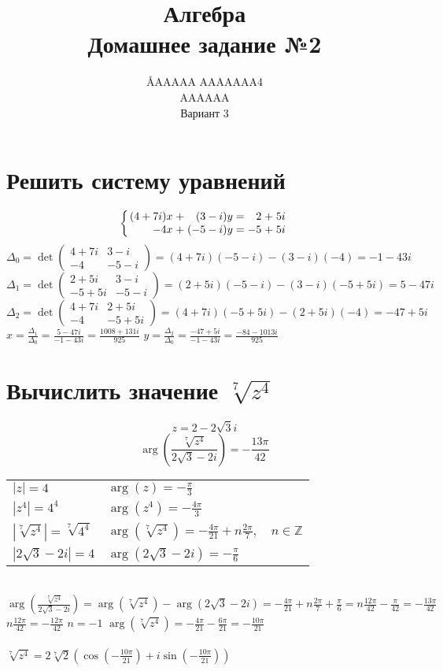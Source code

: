 \documentclass{article}
\title{Алгебра \\ Домашнее задание №2}
\author{\AA{AAAAA AAAAAAA}{4} \\ AAAAAA \\ Вариант 3}
\newcommand{\ds}{\displaystyle}
\newcommand{\abs}[1]{\left|#1\right|}
\newcommand{\Arg}[1]{\arg\left(#1\right)}
\newcommand{\TrigFrom}[1]{
  \left(\cos\left({#1}\right)+i\sin\left({#1}\right)\right)
}
\begin{document}
  \maketitle

  \section{Решить систему уравнений}
  \[
    \left\{
      \arraycolsep=1.4pt
      \begin{array}{rrrrrrr}
        (4+7i)x &+& (3-i)y &=& 2&+&5i \\
        -4x &+& (-5-i)y &=& -5&+&5i
      \end{array}
    \right.
  \]
  $\ds \Delta_0 = \det\begin{pmatrix}
    4+7i & 3-i \\
    -4 & -5-i
  \end{pmatrix} = (4+7i)(-5-i)-(3-i)(-4) = -1-43i$
  \\
  $\ds \Delta_1 = \det\begin{pmatrix}
    2+5i & 3-i \\
    -5+5i & -5-i
  \end{pmatrix} = (2+5i)(-5-i)-(3-i)(-5+5i) = 5-47i$
  \\
  $\ds \Delta_2 = \det\begin{pmatrix}
    4+7i & 2+5i \\
    -4 & -5+5i
  \end{pmatrix} = (4+7i)(-5+5i)-(2+5i)(-4) = -47+5i$
  \\
  $\ds x = \frac{\Delta_1}{\Delta_0} = \frac{5-47i}{-1-43i} = \frac{1008 + 131i}{925}$ \quad
  $\ds y = \frac{\Delta_2}{\Delta_0} = \frac{-47+5i}{-1-43i} = \frac{-84 - 1013i}{925}$

  \section{Вычислить значение $\sqrt[7]{z^4}$}
  $$ z = 2 - 2\sqrt{3}i $$
  $$ \Arg{ \frac{\sqrt[7]{z^4}}{2\sqrt{3} - 2i} } = -\frac{13\pi}{42} $$
  \begin{tabular}{ll}
    $\ds \abs{z} = 4$ & $\ds \Arg z = -\frac{\pi}{3}$ \\
    $\ds \abs{z^4} = 4^4$ & $\ds \Arg{z^4} = -\frac{4\pi}{3}$ \\
    $\ds \abs{\sqrt[7]{z^4}} = \sqrt[7]{4^4}$ & $\ds \Arg{\sqrt[7]{z^4}} = -\frac{4\pi}{21} + n\frac{2\pi}{7},\quad n\in\mathbb{Z}$ \\
    $\ds \abs{2\sqrt{3} - 2i} = 4$ & $\ds \Arg{2\sqrt{3} - 2i} = -\frac{\pi}{6}$
  \end{tabular} \\
  $\ds \Arg{ \frac{\sqrt[7]{z^4}}{2\sqrt{3} - 2i} }
    = \Arg{\sqrt[7]{z^4}} - \Arg{2\sqrt{3} - 2i}
    = -\frac{4\pi}{21} + n\frac{2\pi}{7} + \frac{\pi}{6}
    = n\frac{12\pi}{42} - \frac{\pi}{42}
    = -\frac{13\pi}{42}
  $ \\
  $\ds n\frac{12\pi}{42} = -\frac{12\pi}{42}$ \quad $n = -1$ \quad
  $\ds \Arg{\sqrt[7]{z^4}} = -\frac{4\pi}{21} - \frac{6\pi}{21} = -\frac{10\pi}{21}$ \\ \\
  $\ds \sqrt[7]{z^4} = 2\sqrt[7]{2} \TrigFrom{-\frac{10\pi}{21}}$
\end{document}
